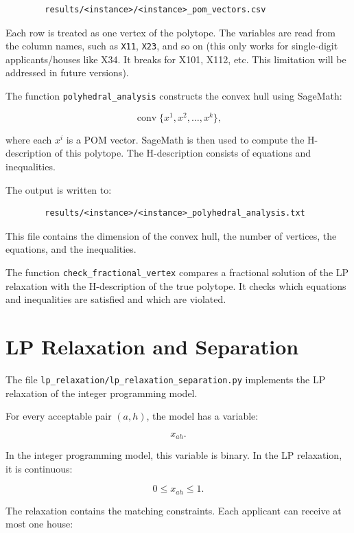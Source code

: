 \documentclass[12pt]{report}
\numberwithin{algorithm}{chapter}
\begin{document}
	\begin{verbatim}
		results/<instance>/<instance>_pom_vectors.csv
	\end{verbatim}
	
	Each row is treated as one vertex of the polytope. The variables are read from the column names, such as \texttt{X11}, \texttt{X23}, and so on (this only works for single-digit applicants/houses like X34. It breaks for X101, X112, etc. This limitation will be addressed in future versions).
	
	The function \texttt{polyhedral\_analysis} constructs the convex hull using SageMath:
	
	\[
	\operatorname{conv}\{x^1,x^2,\ldots,x^k\},
	\]
	
	where each \(x^i\) is a POM vector. SageMath is then used to compute the H-description of this polytope. The H-description consists of equations and inequalities.
	
	The output is written to:
	
	\begin{verbatim}
		results/<instance>/<instance>_polyhedral_analysis.txt
	\end{verbatim}
	
	This file contains the dimension of the convex hull, the number of vertices, the equations, and the inequalities.
	
	The function \texttt{check\_fractional\_vertex} compares a fractional solution of the LP relaxation with the H-description of the true polytope. It checks which equations and inequalities are satisfied and which are violated.
	
	\section{LP Relaxation and Separation}
	
	The file \texttt{lp\_relaxation/lp\_relaxation\_separation.py} implements the LP relaxation of the integer programming model.
	
	For every acceptable pair \((a,h)\), the model has a variable:
	
	\[
	x_{ah}.
	\]
	
	In the integer programming model, this variable is binary. In the LP relaxation, it is continuous:
	
	\[
	0 \leq x_{ah} \leq 1.
	\]
	
	The relaxation contains the matching constraints. Each applicant can receive at most one house:
	
\end{document}
